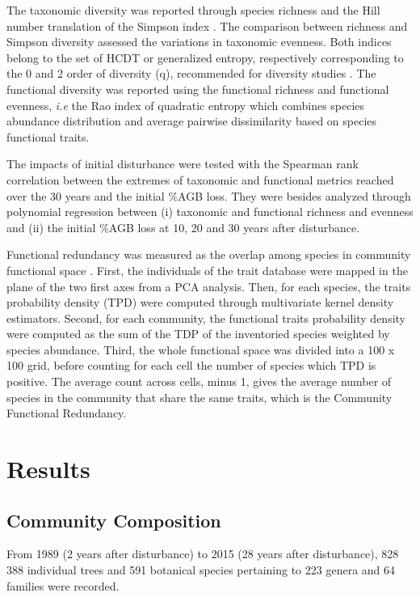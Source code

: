 \documentclass[fleqn,10pt]{ArtEcoFoG} %
\begin{document}
The taxonomic diversity was reported through species richness and the
Hill number translation of the Simpson index \citep{Hill1973}. The
comparison between richness and Simpson diversity assessed the
variations in taxonomic evenness. Both indices belong to the set of HCDT
or generalized entropy, respectively corresponding to the 0 and 2 order
of diversity (q), recommended for diversity studies \citep{Marcon2015b}.
The functional diversity was reported using the functional richness and
functional evenness, \emph{i.e} the Rao index of quadratic entropy which
combines species abundance distribution and average pairwise
dissimilarity based on species functional traits.

The impacts of initial disturbance were tested with the Spearman rank
correlation between the extremes of taxonomic and functional metrics
reached over the 30 years and the initial \%AGB loss. They were besides
analyzed through polynomial regression between (i) taxonomic and
functional richness and evenness and (ii) the initial \%AGB loss at 10,
20 and 30 years after disturbance.

Functional redundancy was measured as the overlap among species in
community functional space \citep{Carmona2016}. First, the individuals
of the trait database were mapped in the plane of the two first axes
from a PCA analysis. Then, for each species, the traits probability
density (TPD) were computed through multivariate kernel density
estimators. Second, for each community, the functional traits
probability density were computed as the sum of the TDP of the
inventoried species weighted by species abundance. Third, the whole
functional space was divided into a 100 x 100 grid, before counting for
each cell the number of species which TPD is positive. The average count
across cells, minus 1, gives the average number of species in the
community that share the same traits, which is the Community Functional
Redundancy.

\section{Results}\label{results}

\subsection{Community Composition}\label{community-composition}

From 1989 (2 years after disturbance) to 2015 (28 years after
disturbance), 828 388 individual trees and 591 botanical species
pertaining to 223 genera and 64 families were recorded.
\end{document}
